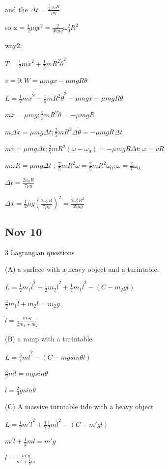 \documentclass{article}
\begin{document}
and the $\Delta t=\frac{\frac27\omega_0R}{\mu g}$

so x  = $\frac12\mu g t^2= \frac2{49\mu g}\omega_0^2R^2$


way2:

$T=\frac12m\dot x^2+\frac15mR^2\dot\theta^2$

$v=0;W=\mu mgx-\mu mgR\theta$

$L=\frac12m\dot x^2+\frac15mR^2\dot\theta^2+\mu mgx-\mu mgR\theta$

$m\ddot x=\mu mg;\frac25mR^2\ddot\theta=-\mu mgR$

$m\Delta\dot x=\mu mg\Delta t;\frac25mR^2\Delta\dot\theta=-\mu mgR\Delta t$

$mv=\mu mg\Delta t;\frac25mR^2(\omega-\omega_0)=-\mu mgR\Delta t;\omega=vR$

$m\omega R=\mu mg\Delta t$ ; $\frac75mR^2\omega=\frac25mR^2\omega_0;\omega=\frac27\omega_0$

$\Delta t=\frac{2\omega_0R}{7\mu g}$

$\Delta x=\frac12\mu g(\frac{2\omega_0R}{7\mu g})^2=\frac{2\omega_0^2R^2}{49\mu g}$

\subsection{Nov 10}

3 Lagrangian questions

(A) a surface with a heavy object and a turintable.

$L=\frac12m_1\dot l^2+\frac12m_2\dot l^2+\frac14m_1\dot l^2-(C-m_2gl)$

$\frac32m_1\ddot l+m_2\ddot l=m_2g$

$\ddot l =\frac{m_2g}{\frac32m_1+m_2}$

(B) a ramp with a turintable

$L=\frac34m\dot l^2-(C-mgsin\theta l)$

$\frac32m\ddot l=mgsin\theta$

$\ddot l=\frac23gsin\theta$

(C) A massive turntable tide with a heavy object

$L=\frac12m'\dot l^2+\frac12\frac12m\dot l^2-(C-m'gl)$

$m'\ddot l+\frac12m\ddot l=m'g$

$\ddot l=\frac{m'g}{m'+\frac12m}$
\end{document}
